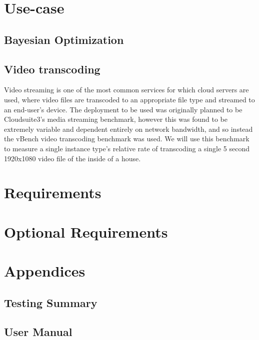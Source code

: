 \documentclass{report}
\begin{document}
\section{Use-case}
\subsection{Bayesian Optimization}
\subsection{Video transcoding}
Video streaming is one of the most common services for which cloud servers are used, where video files are transcoded to an appropriate file type and streamed to an end-user's device\cite{JunXin2005a, Lottarini2018}.
The deployment to be used was originally planned to be Cloudsuite3's media streaming benchmark\cite{Palit2016}, however this was found to be extremely variable and dependent entirely on network bandwidth, and so instead the vBench video transcoding benchmark was used\cite{Lottarini2018}. We will use this benchmark to measure a single instance type's relative rate of transcoding a single 5 second 1920x1080 video file of the inside of a house.
\section{Requirements}
\section{Optional Requirements}
\newpage


\newpage
\section*{Appendices}
\subsection*{Testing Summary}
\subsection*{User Manual}
\end{document}
